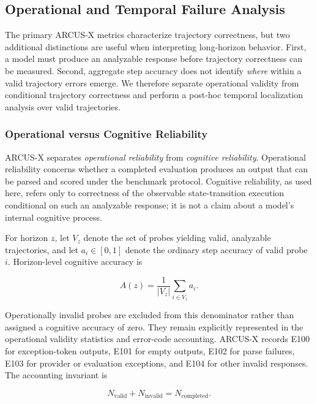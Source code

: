 \documentclass{article}
\begin{document}
\subsection{Operational and Temporal Failure Analysis}
\label{app:operational_temporal}

The primary ARCUS-X metrics characterize trajectory correctness, but two
additional distinctions are useful when interpreting long-horizon behavior.
First, a model must produce an analyzable response before trajectory
correctness can be measured. Second, aggregate step accuracy does not identify
\emph{where} within a valid trajectory errors emerge. We therefore separate
operational validity from conditional trajectory correctness and perform a
post-hoc temporal localization analysis over valid trajectories.

\subsubsection{Operational versus Cognitive Reliability}

ARCUS-X separates \emph{operational reliability} from \emph{cognitive
reliability}. Operational reliability concerns whether a completed evaluation
produces an output that can be parsed and scored under the benchmark protocol.
Cognitive reliability, as used here, refers only to correctness of the
observable state-transition execution conditional on such an analyzable
response; it is not a claim about a model's internal cognitive process.

For horizon $z$, let $V_z$ denote the set of probes yielding valid,
analyzable trajectories, and let $a_i \in [0,1]$ denote the ordinary step
accuracy of valid probe $i$. Horizon-level cognitive accuracy is

\begin{equation}
    A(z)
    =
    \frac{1}{|V_z|}
    \sum_{i \in V_z} a_i.
    \label{eq:conditional_accuracy}
\end{equation}

Operationally invalid probes are excluded from this denominator rather than
assigned a cognitive accuracy of zero. They remain explicitly represented in
the operational validity statistics and error-code accounting. ARCUS-X records
E100 for exception-token outputs, E101 for empty outputs, E102 for parse
failures, E103 for provider or evaluation exceptions, and E104 for other
invalid responses. The accounting invariant is

\begin{equation}
    N_{\mathrm{valid}} + N_{\mathrm{invalid}}
    =
    N_{\mathrm{completed}}.
    \label{eq:validity_partition}
\end{equation}
\end{document}
